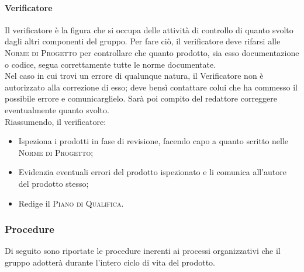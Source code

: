 \documentclass[../norme-di-progetto.tex]{subfiles}
\begin{document}
\paragraph{Verificatore}
Il verificatore è la figura che si occupa delle attività di controllo di quanto svolto dagli altri componenti del gruppo. Per fare ciò, il verificatore deve rifarsi alle \textsc{Norme di Progetto} per controllare che quanto prodotto, sia esso documentazione o codice, segua correttamente tutte le norme documentate. \\
Nel caso in cui trovi un errore di qualunque natura, il Verificatore non è autorizzato alla correzione di esso; deve bensì contattare colui che ha commesso il possibile errore e comunicarglielo. Sarà poi compito del redattore correggere eventualmente quanto svolto. \\
Riassumendo, il verificatore:
\begin{itemize}
  \item Ispeziona i prodotti in fase di revisione, facendo capo a quanto scritto nelle \textsc{Norme di Progetto};
  \item Evidenzia eventuali errori del prodotto ispezionato e li comunica all'autore del prodotto stesso;
  \item Redige il \textsc{Piano di Qualifica}.
\end{itemize}

\subsubsection{Procedure}
Di seguito sono riportate le procedure inerenti ai processi organizzativi che il gruppo adotterà durante l'intero ciclo di vita del prodotto.
\end{document}
